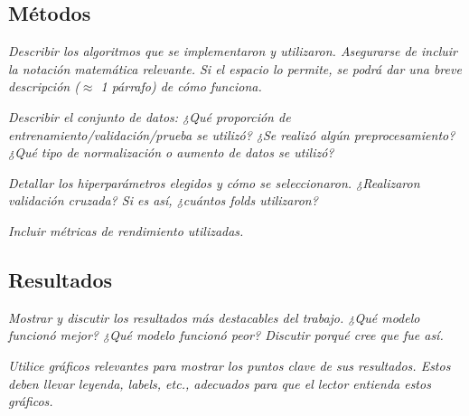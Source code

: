 \documentclass[11pt]{article}
\begin{document}
\subsection{Métodos}
\textit{Describir los algoritmos que se implementaron y utilizaron. Asegurarse de incluir la notación matemática relevante. Si el espacio lo permite, se podrá dar una breve descripción ($\approx$ 1 párrafo) de cómo funciona.}

\textit{Describir el conjunto de datos: ¿Qué proporción de entrenamiento/validación/prueba se utilizó? ¿Se realizó algún preprocesamiento? ¿Qué tipo de normalización o aumento de datos se utilizó?}

\textit{Detallar los hiperparámetros elegidos y cómo se seleccionaron. ¿Realizaron validación cruzada? Si es así, ¿cuántos folds utilizaron?}

\textit{Incluir métricas de rendimiento utilizadas.}

\subsection{Resultados}
\textit{Mostrar y discutir los resultados más destacables del trabajo. ¿Qué modelo funcionó mejor? ¿Qué modelo funcionó peor? Discutir porqué cree que fue así.}

\textit{Utilice gráficos relevantes para mostrar los puntos clave de sus resultados. Estos deben llevar leyenda, labels, etc., adecuados para que el lector entienda estos gráficos.}
\end{document}
